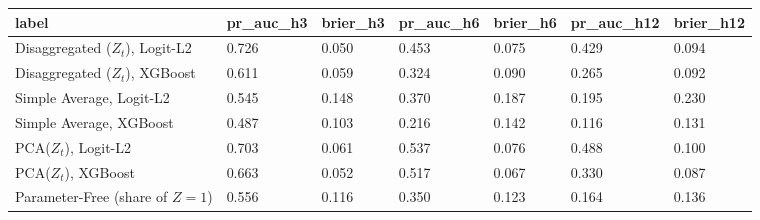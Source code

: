 \begin{tabular}{lllllll}
\toprule
label & pr_auc_h3 & brier_h3 & pr_auc_h6 & brier_h6 & pr_auc_h12 & brier_h12 \\
\midrule
Disaggregated ($Z_t$), Logit-L2 & 0.726 & 0.050 & 0.453 & 0.075 & 0.429 & 0.094 \\
Disaggregated ($Z_t$), XGBoost & 0.611 & 0.059 & 0.324 & 0.090 & 0.265 & 0.092 \\
Simple Average, Logit-L2 & 0.545 & 0.148 & 0.370 & 0.187 & 0.195 & 0.230 \\
Simple Average, XGBoost & 0.487 & 0.103 & 0.216 & 0.142 & 0.116 & 0.131 \\
PCA($Z_t$), Logit-L2 & 0.703 & 0.061 & 0.537 & 0.076 & 0.488 & 0.100 \\
PCA($Z_t$), XGBoost & 0.663 & 0.052 & 0.517 & 0.067 & 0.330 & 0.087 \\
Parameter-Free (share of $Z=1$) & 0.556 & 0.116 & 0.350 & 0.123 & 0.164 & 0.136 \\
\bottomrule
\end{tabular}
